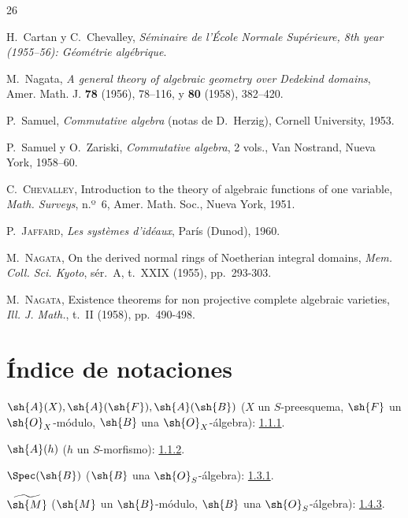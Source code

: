 \documentclass[oneside,10pt]{amsart}
\newcommand{\oldpage}[2][]{\marginnote{\normalfont\footnotesize\textbf{#1}~|~#2}\ignorespaces}
\begin{document}
\begin{thebibliography}{26}

H.~Cartan y C.~Chevalley,
\emph{Séminaire de l'École Normale Supérieure, 8th year (1955--56):
Géométrie algébrique}.

M.~Nagata,
\emph{A general theory of algebraic geometry over Dedekind domains},
Amer. Math. J. \textbf{78} (1956), 78--116, y \textbf{80} (1958),
382--420.

P.~Samuel,
\emph{Commutative algebra} (notas de D.~Herzig), Cornell University,
1953.

P.~Samuel y O.~Zariski,
\emph{Commutative algebra}, 2 vols., Van Nostrand, Nueva York, 1958--60.

\oldpage[II]{205}
C.~\textsc{Chevalley},
Introduction to the theory of algebraic functions of one variable,
\emph{Math. Surveys}, n.º~6, Amer. Math. Soc., Nueva York, 1951.

P.~\textsc{Jaffard},
\emph{Les systèmes d'idéaux}, París (Dunod), 1960.

M.~\textsc{Nagata},
On the derived normal rings of Noetherian integral domains,
\emph{Mem. Coll. Sci. Kyoto}, sér.~A, t.~XXIX (1955), pp.~293-303.

M.~\textsc{Nagata},
Existence theorems for non projective complete algebraic varieties,
\emph{Ill. J. Math.}, t.~II (1958), pp.~490-498.

\end{thebibliography}
\clearpage
\oldpage[II]{206}
\clearpage
\oldpage[II]{207}
{}
\section*{Índice de notaciones}

\begingroup
\small
\setlength{\parindent}{0pt}
\setlength{\parskip}{2pt}

$\sh{A}(X),\sh{A}(\sh{F}),\sh{A}(\sh{B})$
($X$ un $S$-preesquema, $\sh{F}$ un $\sh{O}_X$-módulo,
$\sh{B}$ una $\sh{O}_X$-álgebra): \hyperref[II.1.1.1]{1.1.1}.

$\sh{A}(h)$ ($h$ un $S$-morfismo): \hyperref[II.1.1.2]{1.1.2}.

$\Spec(\sh{B})$ ($\sh{B}$ una $\sh{O}_S$-álgebra): \hyperref[II.1.3.1]{1.3.1}.

$\widetilde{\sh{M}}$ ($\sh{M}$ un $\sh{B}$-módulo,
$\sh{B}$ una $\sh{O}_S$-álgebra): \hyperref[II.1.4.3]{1.4.3}.
\end{document}
